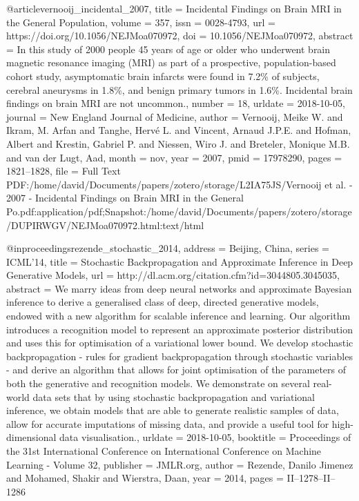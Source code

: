 \documentclass{article}
\begin{document}
@article{vernooij_incidental_2007,
	title = {Incidental {Findings} on {Brain} {MRI} in the {General} {Population}},
	volume = {357},
	issn = {0028-4793},
	url = {https://doi.org/10.1056/NEJMoa070972},
	doi = {10.1056/NEJMoa070972},
	abstract = {In this study of 2000 people 45 years of age or older who underwent brain magnetic resonance imaging (MRI) as part of a prospective, population-based cohort study, asymptomatic brain infarcts were found in 7.2\% of subjects, cerebral aneurysms in 1.8\%, and benign primary tumors in 1.6\%. Incidental brain findings on brain MRI are not uncommon.},
	number = {18},
	urldate = {2018-10-05},
	journal = {New England Journal of Medicine},
	author = {Vernooij, Meike W. and Ikram, M. Arfan and Tanghe, Hervé L. and Vincent, Arnaud J.P.E. and Hofman, Albert and Krestin, Gabriel P. and Niessen, Wiro J. and Breteler, Monique M.B. and van der Lugt, Aad},
	month = nov,
	year = {2007},
	pmid = {17978290},
	pages = {1821--1828},
	file = {Full Text PDF:/home/david/Documents/papers/zotero/storage/L2IA75JS/Vernooij et al. - 2007 - Incidental Findings on Brain MRI in the General Po.pdf:application/pdf;Snapshot:/home/david/Documents/papers/zotero/storage/DUPIRWGV/NEJMoa070972.html:text/html}
}

@inproceedings{rezende_stochastic_2014,
	address = {Beijing, China},
	series = {{ICML}'14},
	title = {Stochastic {Backpropagation} and {Approximate} {Inference} in {Deep} {Generative} {Models}},
	url = {http://dl.acm.org/citation.cfm?id=3044805.3045035},
	abstract = {We marry ideas from deep neural networks and approximate Bayesian inference to derive a generalised class of deep, directed generative models, endowed with a new algorithm for scalable inference and learning. Our algorithm introduces a recognition model to represent an approximate posterior distribution and uses this for optimisation of a variational lower bound. We develop stochastic backpropagation - rules for gradient backpropagation through stochastic variables - and derive an algorithm that allows for joint optimisation of the parameters of both the generative and recognition models. We demonstrate on several real-world data sets that by using stochastic backpropagation and variational inference, we obtain models that are able to generate realistic samples of data, allow for accurate imputations of missing data, and provide a useful tool for high-dimensional data visualisation.},
	urldate = {2018-10-05},
	booktitle = {Proceedings of the 31st {International} {Conference} on {International} {Conference} on {Machine} {Learning} - {Volume} 32},
	publisher = {JMLR.org},
	author = {Rezende, Danilo Jimenez and Mohamed, Shakir and Wierstra, Daan},
	year = {2014},
	pages = {II--1278--II--1286}
}
\end{document}
